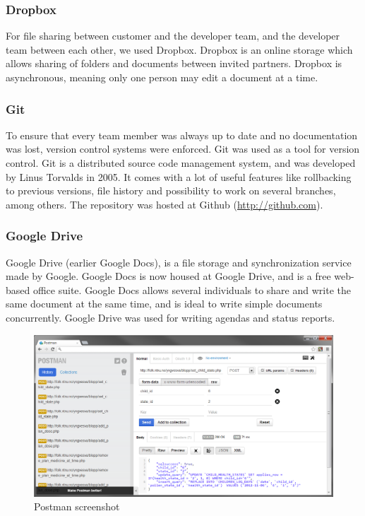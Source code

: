 \subsubsection{Dropbox}
For file sharing between customer and the developer team, and the developer team 
between each other, we used Dropbox. Dropbox\cite{dropbox} is an online storage which 
allows sharing of folders and documents between invited partners. Dropbox is 
asynchronous, meaning only one person may edit a document at a time.

\subsubsection{Git}
To ensure that every team member was always up to date and no documentation was lost, 
version control systems were enforced. Git\cite{git} was used as a tool for version 
control. Git is a distributed source code management system, and was developed by Linus Torvalds in 2005. 
It comes with a lot of useful features like rollbacking to previous versions, file history and possibility to work on several branches, among others. 
The repository was hosted at Github (\url{http://github.com}). 

\subsubsection{Google Drive}
Google Drive (earlier Google Docs), is a file storage and synchronization service made by Google. Google Docs is now housed at Google Drive, and is 
a free web-based office suite. Google Docs allows several individuals to share and write the same document at the same time, and is ideal to write
simple documents concurrently.
Google Drive was used for writing agendas and status reports.


\begin{figure}
	\begin{center}
		\includegraphics[width=17.5cm]{Pictures/Tools/Postman}
	\end{center}
	\caption{Postman screenshot}
	\label{fig:postman}
\end{figure}

